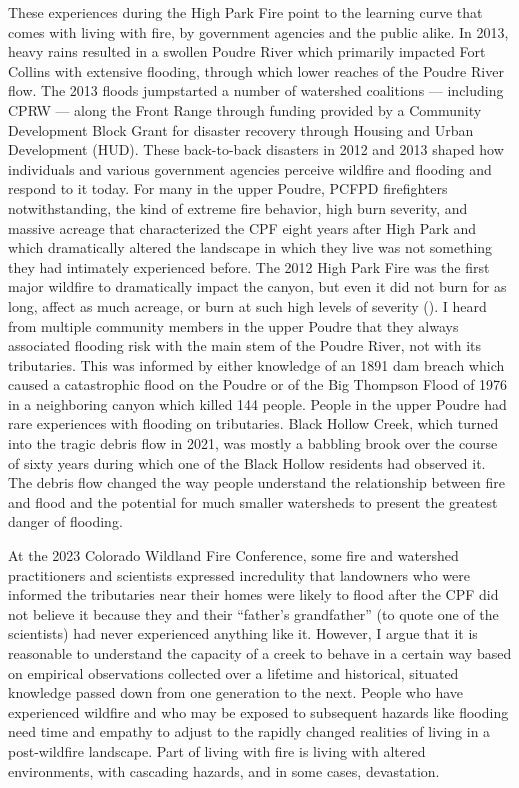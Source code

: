\documentclass[
]{article}
\begin{document}
These experiences during the High Park Fire point to the learning curve that comes with living with fire, by government agencies and the public alike. In 2013, heavy rains resulted in a swollen Poudre River which primarily impacted Fort Collins with extensive flooding, through which lower reaches of the Poudre River flow. The 2013 floods jumpstarted a number of watershed coalitions --- including CPRW --- along the Front Range through funding provided by a Community Development Block Grant for disaster recovery through Housing and Urban Development (HUD). These back-to-back disasters in 2012 and 2013 shaped how individuals and various government agencies perceive wildfire and flooding and respond to it today. For many in the upper Poudre, PCFPD firefighters notwithstanding, the kind of extreme fire behavior, high burn severity, and massive acreage that characterized the CPF eight years after High Park and which dramatically altered the landscape in which they live was not something they had intimately experienced before. The 2012 High Park Fire was the first major wildfire to dramatically impact the canyon, but even it did not burn for as long, affect as much acreage, or burn at such high levels of severity (). I heard from multiple community members in the upper Poudre that they always associated flooding risk with the main stem of the Poudre River, not with its tributaries. This was informed by either knowledge of an 1891 dam breach which caused a catastrophic flood on the Poudre or of the Big Thompson Flood of 1976 in a neighboring canyon which killed 144 people. People in the upper Poudre had rare experiences with flooding on tributaries. Black Hollow Creek, which turned into the tragic debris flow in 2021, was mostly a babbling brook over the course of sixty years during which one of the Black Hollow residents had observed it. The debris flow changed the way people understand the relationship between fire and flood and the potential for much smaller watersheds to present the greatest danger of flooding.

At the 2023 Colorado Wildland Fire Conference, some fire and watershed practitioners and scientists expressed incredulity that landowners who were informed the tributaries near their homes were likely to flood after the CPF did not believe it because they and their ``father's grandfather'' (to quote one of the scientists) had never experienced anything like it. However, I argue that it is reasonable to understand the capacity of a creek to behave in a certain way based on empirical observations collected over a lifetime and historical, situated knowledge passed down from one generation to the next. People who have experienced wildfire and who may be exposed to subsequent hazards like flooding need time and empathy to adjust to the rapidly changed realities of living in a post-wildfire landscape. Part of living with fire is living with altered environments, with cascading hazards, and in some cases, devastation.
\end{document}

